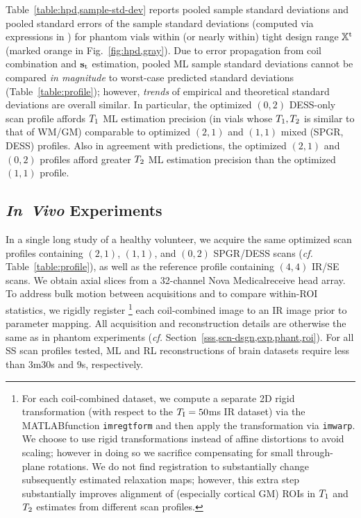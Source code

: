 Table~\ref{table:hpd,sample-std-dev} reports 
pooled sample standard deviations 
and pooled standard errors of the sample standard deviations 
(computed via expressions in \cite{ahn:03:seo}) 
for phantom vials within (or nearly within) 
tight design range $\mathbb{X}^\mathrm{t}$ 
(marked orange in Fig.~\ref{fig:hpd,gray}).
Due to error propagation from coil combination 
and $\mathbf{s}_\mathrm{t}$ estimation, 
pooled ML sample standard deviations 
cannot be compared \emph{in magnitude} 
to worst-case predicted standard deviations 
(Table~\ref{table:profile}); 
however, \emph{trends} 
of empirical and theoretical standard deviations 
are overall similar.
In particular, 
the optimized $(0,2)$ DESS-only scan profile 
affords $T_1$ ML estimation precision 
(in vials whose $T_1,T_2$ is similar to that of WM/GM) 
comparable to optimized $(2,1)$ and $(1,1)$ 
mixed (SPGR, DESS) profiles. 
Also in agreement with predictions, 
the optimized $(2,1)$ and $(0,2)$ profiles 
afford greater $T_2$ ML estimation precision 
than the optimized $(1,1)$ profile.

\subsection{\textit{In~Vivo} Experiments}
\label{ss,scn-dsgn,exp,invivo}

In a single long study of a healthy volunteer, 
we acquire the same optimized scan profiles 
containing $(2,1)$, $(1,1)$, and $(0,2)$ SPGR/DESS scans 
(\emph{cf.} Table~\ref{table:profile}), 
as well as the reference profile 
containing $(4,4)$ IR/SE scans.
We obtain axial slices 
from a 32-channel Nova Medical\regis receive head array.
To address bulk motion between acquisitions 
and to compare within-ROI statistics, 
we rigidly register
\footnote{For each coil-combined dataset, 
we compute a separate 2D rigid transformation 
(with respect to the $T_\mathrm{I} = 50$ms IR dataset) 
via the MATLAB\regis function \texttt{imregtform} 
and then apply the transformation via \texttt{imwarp}.
We choose to use rigid transformations 
instead of affine distortions to avoid scaling; 
however in doing so we sacrifice compensating 
for small through-plane rotations. 
We do not find registration 
to substantially change subsequently estimated relaxation maps; 
however, this extra step substantially improves alignment 
of (especially cortical GM) ROIs 
in $T_1$ and $T_2$ estimates from different scan profiles.
} 
each coil-combined image to an IR image
prior to parameter mapping.
All acquisition and reconstruction details 
are otherwise the same as in phantom experiments
(\emph{cf.} Section~\ref{sss,scn-dsgn,exp,phant,roi}). 
For all SS scan profiles tested, 
ML and RL reconstructions 
of brain datasets require less than 3m30s and 9s, respectively.

